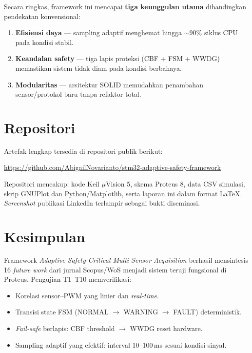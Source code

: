 \documentclass[12pt,a4paper]{article}
\begin{document}
Secara ringkas, framework ini mencapai \textbf{tiga keunggulan utama} dibandingkan pendekatan konvensional:
\begin{enumerate}
    \item \textbf{Efisiensi daya} --- sampling adaptif menghemat hingga $\sim$90\% siklus CPU pada kondisi stabil.
    \item \textbf{Keandalan safety} --- tiga lapis proteksi (CBF + FSM + WWDG) memastikan sistem tidak diam pada kondisi berbahaya.
    \item \textbf{Modularitas} --- arsitektur SOLID memudahkan penambahan sensor/protokol baru tanpa refaktor total.
\end{enumerate}

\section{Repositori}

Artefak lengkap tersedia di repositori publik berikut:

\begin{center}
\url{https://github.com/AbigailNovarianto/stm32-adaptive-safety-framework}
\end{center}

Repositori mencakup: kode Keil $\mu$Vision 5, skema Proteus 8, data CSV simulasi, skrip GNUPlot dan Python/Matplotlib, serta laporan ini dalam format LaTeX. \textit{Screenshot} publikasi LinkedIn terlampir sebagai bukti diseminasi.

\section{Kesimpulan}

Framework \textit{Adaptive Safety-Critical Multi-Sensor Acquisition} berhasil mensintesis 16 \textit{future work} dari jurnal Scopus/WoS menjadi sistem teruji fungsional di Proteus. Pengujian T1--T10 memverifikasi:
\begin{itemize}
    \item Korelasi sensor--PWM yang linier dan \textit{real-time}.
    \item Transisi state FSM (NORMAL $\to$ WARNING $\to$ FAULT) deterministik.
    \item \textit{Fail-safe} berlapis: CBF threshold $\to$ WWDG reset hardware.
    \item Sampling adaptif yang efektif: interval 10--100\,ms sesuai kondisi sinyal.
\end{itemize}
\end{document}
